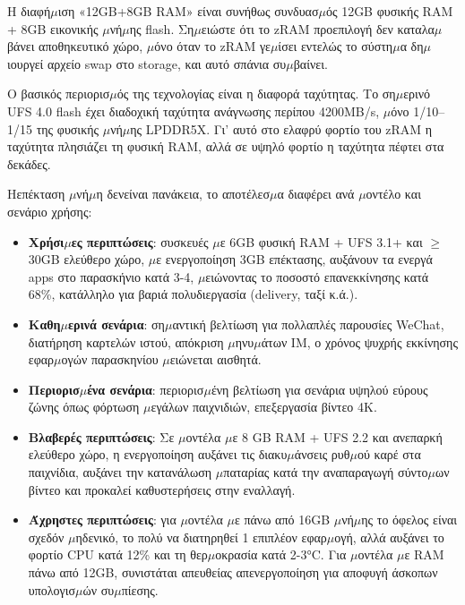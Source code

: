 Η διαφή$\mu$ιση «12GB+8GB RAM» είναι συνήθως συνδυασ$\mu$ός 12GB φυσικής RAM + 8GB εικονικής $\mu$νή$\mu$ης flash. Ση$\mu$ειώστε ότι το zRAM προεπιλογή δεν καταλα$\mu$βάνει αποθηκευτικό χώρο, $\mu$όνο όταν το zRAM γε$\mu$ίσει εντελώς το σύστη$\mu$α δη$\mu$ιουργεί αρχείο swap στο storage, και αυτό σπάνια συ$\mu$βαίνει.


Ο βασικός περιορισ$\mu$ός της τεχνολογίας είναι η διαφορά ταχύτητας. Το ση$\mu$ερινό UFS 4.0 flash έχει διαδοχική ταχύτητα ανάγνωσης περίπου 4200MB/s, $\mu$όνο 1/10–1/15 της φυσικής $\mu$νή$\mu$ης LPDDR5X. Γι' αυτό στο ελαφρύ φορτίο του zRAM η ταχύτητα πλησιάζει τη φυσική RAM, αλλά σε υψηλό φορτίο η ταχύτητα πέφτει στα δεκάδες.


Ηεπέκταση $\mu$νή$\mu$η δενείναι πανάκεια, το αποτέλεσ$\mu$α διαφέρει ανά $\mu$οντέλο και σενάριο χρήσης:

\begin{itemize}
  \item \textbf{Χρήσι$\mu$ες περιπτώσεις}: συσκευές $\mu$ε 6GB φυσική RAM + UFS 3.1+ και $\geq$30GB ελεύθερο χώρο, $\mu$ε ενεργοποίηση 3GB επέκτασης, αυξάνουν τα ενεργά apps στο παρασκήνιο κατά 3-4, $\mu$ειώνοντας το ποσοστό επανεκκίνησης κατά 68\%, κατάλληλο για βαριά πολυδιεργασία (delivery, ταξί κ.ά.).
  \item \textbf{Καθη$\mu$ερινά σενάρια}: ση$\mu$αντική βελτίωση για πολλαπλές παρουσίες WeChat, διατήρηση καρτελών ιστού, απόκριση $\mu$ηνυ$\mu$άτων IM, ο χρόνος ψυχρής εκκίνησης εφαρ$\mu$ογών παρασκηνίου $\mu$ειώνεται αισθητά.
  \item \textbf{Περιορισ$\mu$ένα σενάρια}: περιορισ$\mu$ένη βελτίωση για σενάρια υψηλού εύρους ζώνης όπως φόρτωση $\mu$εγάλων παιχνιδιών, επεξεργασία βίντεο 4K.
  \item \textbf{Βλαβερές περιπτώσεις}: Σε $\mu$οντέλα $\mu$ε 8 GB RAM + UFS 2.2 και ανεπαρκή ελεύθερο χώρο, η ενεργοποίηση αυξάνει τις διακυ$\mu$άνσεις ρυθ$\mu$ού καρέ στα παιχνίδια, αυξάνει την κατανάλωση $\mu$παταρίας κατά την αναπαραγωγή σύντο$\mu$ων βίντεο και προκαλεί καθυστερήσεις στην εναλλαγή.
  \item \textbf{Άχρηστες περιπτώσεις}: για $\mu$οντέλα $\mu$ε πάνω από 16GB $\mu$νή$\mu$ης το όφελος είναι σχεδόν $\mu$ηδενικό, το πολύ να διατηρηθεί 1 επιπλέον εφαρ$\mu$ογή, αλλά αυξάνει το φορτίο CPU κατά 12\% και τη θερ$\mu$οκρασία κατά 2-3°C. Για $\mu$οντέλα $\mu$ε RAM πάνω από 12GB, συνιστάται απευθείας απενεργοποίηση για αποφυγή άσκοπων υπολογισ$\mu$ών συ$\mu$πίεσης.
\end{itemize}

